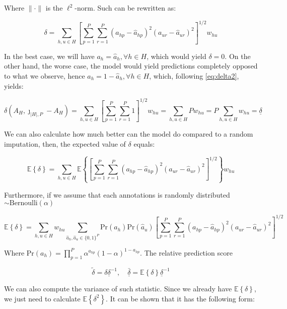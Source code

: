 \documentclass[12pt]{article}
\renewcommand{\Pr}[1]{{\mbox{Pr}\left(#1\right) }}
\newcommand{\Expected}[1]{{\mathbb{E}\left\{#1\right\}}}
\begin{document}
Where $\|\cdot\|$ is the $\ell^2$-norm. Such can be rewritten as:

\begin{equation}
\label{eq:delta2}
\delta = \sum_{h, u \in H}\left[\sum_{p=1}^P\sum_{r=1}^P (a_{hp} - \hat a_{hp})^2(a_{ur} - \hat a_{ur})^2\right]^{1/2}w_{hu}
\end{equation}

In the best case, we will have $a_h = \hat a_h, \forall h \in H$, which would yield $\delta = 0$. On the other hand, the worse case, the model would yield predictions completely opposed to what we observe, hence $a_h = 1 - \hat a_h, \forall h \in H$, which, following \eqref{eq:delta2}, yields:

\begin{equation*}
\delta\left(A_H, \jmath_{|H|, P} - A_H\right)  = %
\sum_{h, u \in H}\left[\sum_{p=1}^P\sum_{r=1}^P 1\right]^{1/2}w_{hu} = %
\sum_{h, u \in H}Pw_{hu} = P \sum_{h, u \in H}w_{hu} = \underline{\delta}
\end{equation*}

We can also calculate how much better can the model do compared to a random imputation, then, the expected value of $\delta$ equals:

\begin{equation*}
\Expected{\delta} = \sum_{h, u \in H}\Expected{\left[\sum_{p=1}^P\sum_{r=1}^P (a_{hp} - \hat a_{hp})^2(a_{ur} - \hat a_{ur})^2\right]^{1/2}}w_{hu}
\end{equation*}

Furthermore, if we assume that each annotations is randomly distributed $\sim\mbox{Bernoulli}(\alpha)$

\begin{equation}
\Expected{\delta} = \sum_{h, u \in H}w_{hu}\sum_{\hat a_h, \hat a_u \in \{0,1\}^P}\Pr{\hat a_h}\Pr{\hat a_u}\left[\sum_{p=1}^P\sum_{r=1}^P (a_{hp} - \hat a_{hp})^2(a_{ur} - \hat a_{ur})^2\right]^{1/2}
\end{equation}


Where $\Pr{a_h} = \prod_{p=1}^P\alpha^{a_{hp}}(1 - \alpha)^{1 - a_{hp}}$. The relative prediction score 

\begin{equation}
\tilde\delta = \delta \underline{\delta}^{-1},\quad \underline{\bar{\delta}} = \Expected{\delta}\underline{\delta}^{-1}
\end{equation}

We can also compute the variance of such statistic. Since we already have $\Expected{\delta}$, we just need to calculate $\Expected{\delta^2}$. It can be shown that it has the following form:
\end{document}

